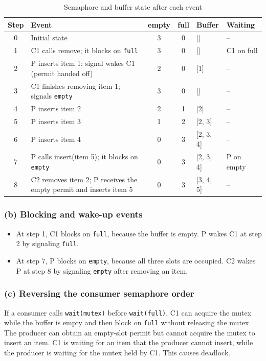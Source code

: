 \documentclass[conference]{IEEEtran}
\begin{document}
\begin{table}[t]
\centering
\caption{Semaphore and buffer state after each event}
\small
\begin{tabular}{c|p{5.2cm}|c|c|p{2.6cm}|p{2.0cm}}
Step & Event & empty & full & Buffer & Waiting\\ \hline
0 & Initial state & 3 & 0 & [] & --\\
1 & C1 calls remove; it blocks on \texttt{full} & 3 & 0 & [] & C1 on full\\
2 & P inserts item 1; signal wakes C1 (permit handed off) & 2 & 0 & [1] & --\\
3 & C1 finishes removing item 1; signals \texttt{empty} & 3 & 0 & [] & --\\
4 & P inserts item 2 & 2 & 1 & [2] & --\\
5 & P inserts item 3 & 1 & 2 & [2, 3] & --\\
6 & P inserts item 4 & 0 & 3 & [2, 3, 4] & --\\
7 & P calls insert(item 5); it blocks on \texttt{empty} & 0 & 3 & [2, 3, 4] & P on empty\\
8 & C2 removes item 2; P receives the empty permit and inserts item 5 & 0 & 3 & [3, 4, 5] & --
\end{tabular}
\end{table}

\subsubsection{(b) Blocking and wake-up events}
\begin{itemize}
    \item At step 1, C1 blocks on \texttt{full}, because the buffer is empty. P wakes C1 at step 2 by signaling \texttt{full}.
    \item At step 7, P blocks on \texttt{empty}, because all three slots are occupied. C2 wakes P at step 8 by signaling \texttt{empty} after removing an item.
\end{itemize}

\subsubsection{(c) Reversing the consumer semaphore order}
If a consumer calls \texttt{wait(mutex)} before \texttt{wait(full)}, C1 can acquire the mutex while the buffer is empty and then block on \texttt{full} without releasing the mutex. The producer can obtain an empty-slot permit but cannot acquire the mutex to insert an item. C1 is waiting for an item that the producer cannot insert, while the producer is waiting for the mutex held by C1. This causes deadlock.
\end{document}

